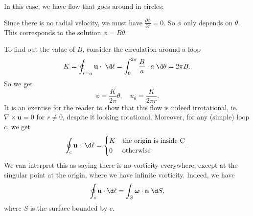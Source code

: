 \documentclass[a4paper]{article}
\begin{document}
\begin{eg}
  In this case, we have flow that goes around in circles:
  \begin{center}
  \end{center}
  Since there is no radial velocity, we must have $\frac{\partial \phi}{\partial r} = 0$. So $\phi$ only depends on $\theta$. This corresponds to the solution $\phi = B\theta$.

  To find out the value of $B$, consider the circulation around a loop
  \[
    K = \oint_{r = a} \mathbf{u}\cdot \;\d \ell = \int_0^{2\pi} \frac{B}{a} \cdot a \;\d \theta = 2\pi B.
  \]
  So we get
  \[
    \phi = \frac{K}{2\pi}\theta,\quad u_\theta = \frac{K}{2\pi r}.
  \]
  It is an exercise for the reader to show that this flow is indeed irrotational, ie. $\nabla \times \mathbf{u} = 0$ for $r \not= 0$, despite it looking rotational. Moreover, for any (simple) loop $c$, we get
  \[
    \oint_c \mathbf{u}\cdot\;\d \ell =
    \begin{cases}
      K & \text{the origin is inside C}\\
      0 & \text{otherwise}
    \end{cases}.
  \]
  We can interpret this as saying there is no vorticity everywhere, except at the singular point at the origin, where we have infinite vorticity. Indeed, we have
  \[
    \oint_c \mathbf{u}\cdot \d \ell = \int_S \boldsymbol\omega \cdot \mathbf{n} \;\d S,
  \]
  where $S$ is the surface bounded by $c$.
\end{eg}
\end{document}
